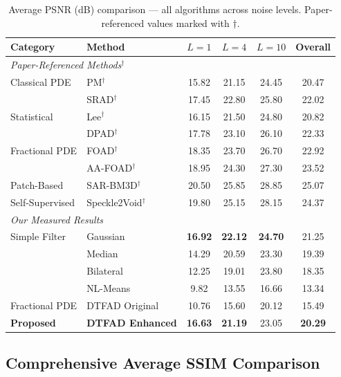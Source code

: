 \documentclass[12pt,a4paper]{article}
\newcommand{\best}[1]{\textcolor{bestgreen}{\textbf{#1}}}
\newcommand{\second}[1]{\textcolor{secondbest}{\textbf{#1}}}
\begin{document}
\begin{table}[H]
\centering
\caption{Average PSNR (dB) comparison — all algorithms across noise levels. Paper-referenced values marked with $\dagger$.}
\label{tab:comprehensive_psnr}
\begin{tabular}{llccc|c}
\toprule
\textbf{Category} & \textbf{Method} & \textbf{$L=1$} & \textbf{$L=4$} & \textbf{$L=10$} & \textbf{Overall} \\
\midrule
\multicolumn{6}{l}{\textit{Paper-Referenced Methods}$^{\dagger}$} \\
Classical PDE & PM$^\dagger$ & 15.82 & 21.15 & 24.45 & 20.47 \\
 & SRAD$^\dagger$ & 17.45 & 22.80 & 25.80 & 22.02 \\
Statistical & Lee$^\dagger$ & 16.15 & 21.50 & 24.80 & 20.82 \\
 & DPAD$^\dagger$ & 17.78 & 23.10 & 26.10 & 22.33 \\
Fractional PDE & FOAD$^\dagger$ & 18.35 & 23.70 & 26.70 & 22.92 \\
 & AA-FOAD$^\dagger$ & 18.95 & 24.30 & 27.30 & 23.52 \\
Patch-Based & SAR-BM3D$^\dagger$ & 20.50 & 25.85 & 28.85 & 25.07 \\
Self-Supervised & Speckle2Void$^\dagger$ & 19.80 & 25.15 & 28.15 & 24.37 \\
\midrule
\multicolumn{6}{l}{\textit{Our Measured Results}} \\
Simple Filter & Gaussian & \second{16.92} & \best{22.12} & \best{24.70} & 21.25 \\
 & Median & 14.29 & 20.59 & 23.30 & 19.39 \\
 & Bilateral & 12.25 & 19.01 & 23.80 & 18.35 \\
 & NL-Means & 9.82 & 13.55 & 16.66 & 13.34 \\
Fractional PDE & DTFAD Original & 10.76 & 15.60 & 20.12 & 15.49 \\
\rowcolor{lightblue!30}
\textbf{Proposed} & \textbf{DTFAD Enhanced} & \best{16.63} & \second{21.19} & 23.05 & \textbf{20.29} \\
\bottomrule
\end{tabular}
\end{table}

\subsection{Comprehensive Average SSIM Comparison}
\end{document}
